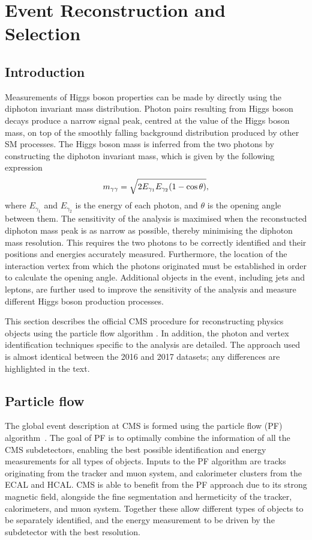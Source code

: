 \chapter{Event Reconstruction and Selection}
\label{chap:objects}

\section{Introduction}

Measurements of Higgs boson properties can be made 
by directly using the diphoton invariant mass distribution.
Photon pairs resulting from Higgs boson decays produce a narrow signal peak, 
centred at the value of the Higgs boson mass, 
on top of the smoothly falling background distribution produced by other SM processes.
The Higgs boson mass is inferred from the two photons by constructing the diphoton invariant mass, 
which is given by the following expression
\begin{equation}
\label{eq:obj_mgg}
m_{\gamma\gamma} = \sqrt{ 2 E_{\gamma_1} E_{\gamma_2} (1 - \cos{\theta}) } ,
\end{equation}
where $E_{\gamma_1}$ and $E_{\gamma_2}$ is the energy of each photon, 
and $\theta$ is the opening angle between them.
The sensitivity of the analysis is maximised 
when the reconstucted diphoton mass peak is as narrow as possible, 
thereby minimising the diphoton mass resolution.
This requires the two photons to be correctly identified 
and their positions and energies accurately measured.
Furthermore, the location of the interaction vertex from which the photons originated 
must be established in order to calculate the opening angle.
Additional objects in the event, including jets and leptons, 
are further used to improve the sensitivity of the analysis 
and measure different Higgs boson production processes.

This section describes the official CMS procedure for reconstructing physics objects using the particle flow algorithm \cite{ParticleFlow}.
In addition, the photon and vertex identification techniques specific to the \Hgg analysis are detailed.
The approach used is almost identical between the 2016 and 2017 datasets; 
any differences are highlighted in the text.

\section{Particle flow}
The global event description at CMS is formed using the particle flow (PF) algorithm~\cite{ParticleFlow}.
The goal of PF is to optimally combine the information of all the CMS subdetectors, 
enabling the best possible identification and energy measurements for all types of objects.
Inputs to the PF algorithm are tracks originating from the tracker and muon system, 
and calorimeter clusters from the ECAL and HCAL.
CMS is able to benefit from the PF approach due to its strong magnetic field, 
alongside the fine segmentation and hermeticity of the tracker, calorimeters, and muon system.
Together these allow different types of objects to be separately identified, 
and the energy measurement to be driven by the subdetector with the best resolution.

